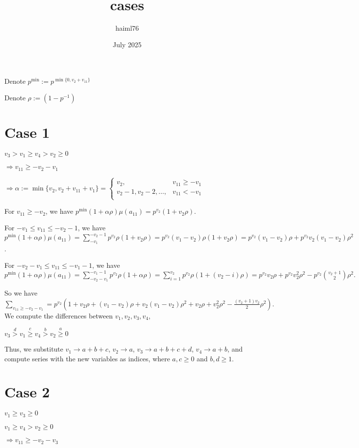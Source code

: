 \documentclass{article}
\title{cases}
\author{haiml76 }
\date{July 2025}
\begin{document}
\maketitle
Denote $p^{\min}:=p^{\min\{0,v_2+v_{11}\}}$

Denote $\rho:=(1-p^{-1})$
\section{Case 1}
$v_3>v_1\geq{v_4}>v_2\geq{0}$

$\Rightarrow{v_{11}}\geq{-v_2-v_1}$

$\Rightarrow\alpha:=\min\{v_2,v_2+v_{11}+v_1\}=     \begin{cases}
       v_2, & v_{11}\geq{-v_1}\\
       v_2-1,v_2-2,\dots, & v_{11}<{-v_1}\\
     \end{cases}$

For $v_{11}\geq{-v_2}$, we have $p^{\min}(1+\alpha\rho)\mu(a_{11})=p^{v_2}(1+v_2\rho)$.

For $-v_1\leq{v_{11}}\leq{-v_2-1}$, we have $p^{\min}(1+\alpha\rho)\mu(a_{11})=\sum_{-v_1}^{-v_2-1}p^{v_2}\rho(1+v_2\rho)=p^{v_2}(v_1-v_2)\rho(1+v_2\rho)=p^{v_2}(v_1-v_2)\rho+p^{v_2}v_2(v_1-v_2)\rho^2$.

For $-v_2-v_1\leq{v_{11}}\leq{-v_1-1}$, we have $p^{\min}(1+\alpha\rho)\mu(a_{11})=\sum_{-v_2-v_1}^{-v_1-1}p^{v_2}\rho(1+\alpha\rho)=\sum_{i=1}^{v_2}p^{v_2}\rho(1+(v_2-i)\rho)=p^{v_2}v_2\rho+p^{v_2}v_2^2\rho^2-p^{v_2}\binom{v_2+1}{2}\rho^2.$

So we have $\sum_{v_{11}\geq{-v_2-v_1}}=p^{v_2}(1+v_2\rho+(v_1-v_2)\rho+v_2(v_1-v_2)\rho^2+v_2\rho+v_2^2\rho^2-\frac{(v_2+1)v_2}{2}\rho^2).$
We compute the differences between $v_1,v_2,v_3,v_4$,

$v_3\overset{d}{>}v_1\overset{c}{\geq}{v_4}\overset{b}>v_2\overset{a}{\geq}{0}$

Thus, we substitute $v_1\rightarrow{a+b+c}$, $v_2\rightarrow{a}$, $v_3\rightarrow{a+b+c+d}$, $v_4\rightarrow{a+b}$, and compute series with the new variables as indices, where $a,c\geq{0}$ and $b,d\geq{1}$.

\section{Case 2}
$v_1\geq{v_3}\geq{0}$

$v_1\geq{v_4}>v_2\geq{0}$

$\Rightarrow{v_{11}}\geq{-v_2-v_3}$
\end{document}
